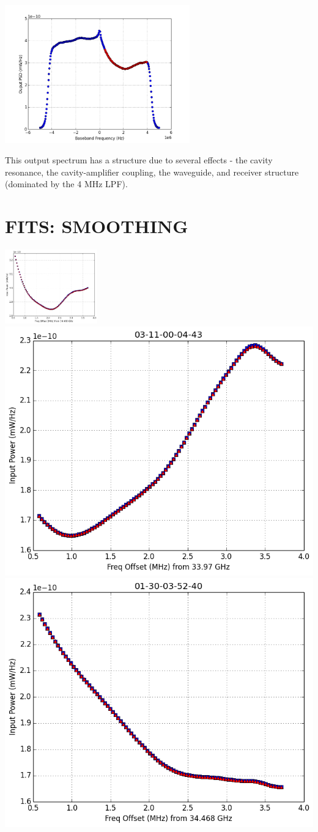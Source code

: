 \documentclass[11pt]{article}
\begin{document}
\centering \includegraphics[width=0.6\textwidth]{cutondata}

This output spectrum has a structure due to several effects - the cavity resonance, the cavity-amplifier coupling, the waveguide, and receiver structure (dominated by the 4 MHz LPF).

\section{FITS: SMOOTHING}

\includegraphics[width=0.3\textwidth]{Dec04-11-33-24inputpltposfreq_237}
\includegraphics[width=0.3 \textwidth]{03-11-00-04-43inputpltposfreq_261}
\includegraphics[width=0.3 \textwidth]{01-30-03-52-40inputpltposfreq_261}
\end{document}
